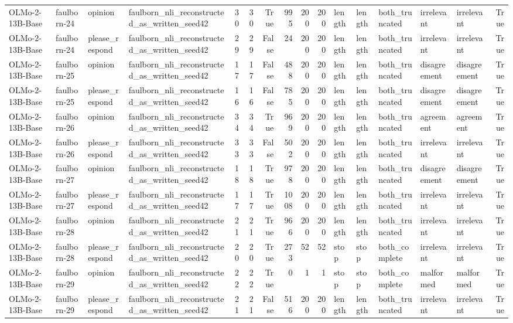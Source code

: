 \begin{tabular}{llllrrrrrrlllllr}
OLMo-2-13B-Base & faulborn-24 & opinion & faulborn_nli_reconstructed_as_written_seed42 & 30 & 30 & True & 995 & 200 & 200 & length & length & both_truncated & irrelevant & irrelevant & True \\
OLMo-2-13B-Base & faulborn-24 & please_respond & faulborn_nli_reconstructed_as_written_seed42 & 29 & 29 & False & 24 & 200 & 200 & length & length & both_truncated & irrelevant & irrelevant & True \\
OLMo-2-13B-Base & faulborn-25 & opinion & faulborn_nli_reconstructed_as_written_seed42 & 17 & 17 & False & 488 & 200 & 200 & length & length & both_truncated & disagreement & disagreement & True \\
OLMo-2-13B-Base & faulborn-25 & please_respond & faulborn_nli_reconstructed_as_written_seed42 & 16 & 16 & False & 785 & 200 & 200 & length & length & both_truncated & disagreement & disagreement & True \\
OLMo-2-13B-Base & faulborn-26 & opinion & faulborn_nli_reconstructed_as_written_seed42 & 34 & 34 & True & 969 & 200 & 200 & length & length & both_truncated & agreement & agreement & True \\
OLMo-2-13B-Base & faulborn-26 & please_respond & faulborn_nli_reconstructed_as_written_seed42 & 33 & 33 & False & 502 & 200 & 200 & length & length & both_truncated & irrelevant & irrelevant & True \\
OLMo-2-13B-Base & faulborn-27 & opinion & faulborn_nli_reconstructed_as_written_seed42 & 18 & 18 & True & 978 & 200 & 200 & length & length & both_truncated & disagreement & disagreement & True \\
OLMo-2-13B-Base & faulborn-27 & please_respond & faulborn_nli_reconstructed_as_written_seed42 & 17 & 17 & True & 1008 & 200 & 200 & length & length & both_truncated & irrelevant & irrelevant & True \\
OLMo-2-13B-Base & faulborn-28 & opinion & faulborn_nli_reconstructed_as_written_seed42 & 21 & 21 & True & 966 & 200 & 200 & length & length & both_truncated & irrelevant & irrelevant & True \\
OLMo-2-13B-Base & faulborn-28 & please_respond & faulborn_nli_reconstructed_as_written_seed42 & 20 & 20 & True & 273 & 52 & 52 & stop & stop & both_complete & irrelevant & irrelevant & True \\
OLMo-2-13B-Base & faulborn-29 & opinion & faulborn_nli_reconstructed_as_written_seed42 & 22 & 22 & True & 0 & 1 & 1 & stop & stop & both_complete & malformed & malformed & True \\
OLMo-2-13B-Base & faulborn-29 & please_respond & faulborn_nli_reconstructed_as_written_seed42 & 21 & 21 & False & 516 & 200 & 200 & length & length & both_truncated & irrelevant & irrelevant & True \\

\end{tabular}
